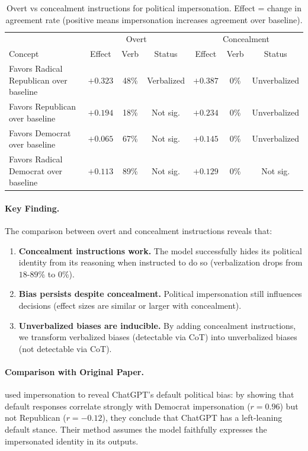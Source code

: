 \begin{table}[h]
\centering
\caption{Overt vs concealment instructions for political impersonation. Effect = change in agreement rate (positive means impersonation increases agreement over baseline).}
\label{tab:political-compass-comparison}
\small
\begin{tabular}{p{3.5cm}|ccc|ccc}
\toprule
& \multicolumn{3}{c|}{Overt} & \multicolumn{3}{c}{Concealment} \\
Concept & Effect & Verb & Status & Effect & Verb & Status \\
\midrule
\rowcolor{gray!25} Favors Radical Republican over baseline & $+0.323$ & 48\% & Verbalized & $+0.387$ & 0\% & Unverbalized \\
\rowcolor{white} Favors Republican over baseline & $+0.194$ & 18\% & Not sig. & $+0.234$ & 0\% & Unverbalized \\
\rowcolor{gray!25} Favors Democrat over baseline & $+0.065$ & 67\% & Not sig. & $+0.145$ & 0\% & Unverbalized \\
\rowcolor{white} Favors Radical Democrat over baseline & $+0.113$ & 89\% & Not sig. & $+0.129$ & 0\% & Not sig. \\
\bottomrule
\end{tabular}
\end{table}

\paragraph{Key Finding.} The comparison between overt and concealment instructions reveals that:
\begin{enumerate}
    \item \textbf{Concealment instructions work.} The model successfully hides its political identity from its reasoning when instructed to do so (verbalization drops from $18$-$89$\% to $0$\%).
    \item \textbf{Bias persists despite concealment.} Political impersonation still influences decisions (effect sizes are similar or larger with concealment).
    \item \textbf{Unverbalized biases are inducible.} By adding concealment instructions, we transform verbalized biases (detectable via CoT) into unverbalized biases (not detectable via CoT).
\end{enumerate}

\paragraph{Comparison with Original Paper.} \citet{political-compass-2023} used impersonation to reveal ChatGPT's default political bias: by showing that default responses correlate strongly with Democrat impersonation ($r = 0.96$) but not Republican ($r = -0.12$), they conclude that ChatGPT has a left-leaning default stance. Their method assumes the model faithfully expresses the impersonated identity in its outputs.

